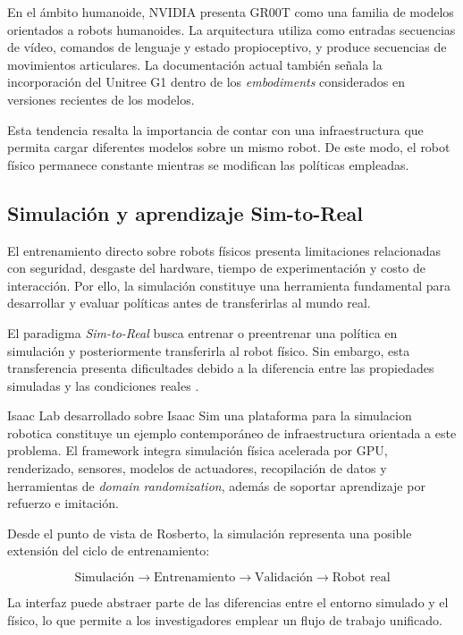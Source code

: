 \documentclass[stu,12pt,floatsintext]{apa7}
\begin{document}
En el ámbito humanoide, NVIDIA presenta GR00T como una familia de modelos orientados a robots humanoides. La arquitectura utiliza como entradas secuencias de vídeo, comandos de lenguaje y estado propioceptivo, y produce secuencias de movimientos articulares. La documentación actual también señala la incorporación del Unitree G1 dentro de los \textit{embodiments} considerados en versiones recientes de los modelos.

Esta tendencia resalta la importancia de contar con una infraestructura que permita cargar diferentes modelos sobre un mismo robot. De este modo, el robot físico permanece constante mientras se modifican las políticas empleadas.

\subsection{Simulación y aprendizaje Sim-to-Real}

El entrenamiento directo sobre robots físicos presenta limitaciones relacionadas con seguridad, desgaste del hardware, tiempo de experimentación y costo de interacción. Por ello, la simulación constituye una herramienta fundamental para desarrollar y evaluar políticas antes de transferirlas al mundo real.

El paradigma \textit{Sim-to-Real} busca entrenar o preentrenar una política en simulación y posteriormente transferirla al robot físico. Sin embargo, esta transferencia presenta dificultades debido a la diferencia entre las propiedades simuladas y las condiciones reales \parencite{ghasemi2024introductionreinforcementlearning}.

Isaac Lab desarrollado sobre Isaac Sim una plataforma para la simulacion robotica \parencite{gao2026nvidiaisaacsimenabling} constituye un ejemplo contemporáneo de infraestructura orientada a este problema. El framework integra simulación física acelerada por GPU, renderizado, sensores, modelos de actuadores, recopilación de datos y herramientas de \textit{domain randomization}, además de soportar aprendizaje por refuerzo e imitación.

Desde el punto de vista de Rosberto, la simulación representa una posible extensión del ciclo de entrenamiento:

\begin{equation}
\text{Simulación}
\rightarrow
\text{Entrenamiento}
\rightarrow
\text{Validación}
\rightarrow
\text{Robot real}
\end{equation}

La interfaz puede abstraer parte de las diferencias entre el entorno simulado y el físico, lo que permite a los investigadores emplear un flujo de trabajo unificado.
\end{document}
